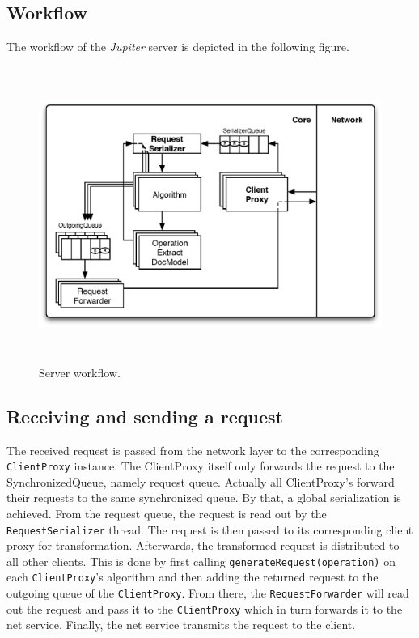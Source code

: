 \subsection{Workflow}
The workflow of the \emph{Jupiter} server is depicted in the following figure.
\begin{figure}[H]
\centering
\includegraphics[height=9.64cm,width=14.3cm]{../../images/algo-impl/workflow_server.eps}
\caption{Server workflow.}
\label{Server workflow.}
\end{figure}

\subsection{Receiving and sending a request}
The received request is passed from the network layer to the corresponding \texttt{ClientProxy} instance. The {ClientProxy} itself only forwards the request to the {SynchronizedQueue}, namely request queue. Actually all {ClientProxy}'s forward their requests to the same synchronized queue. By that, a global serialization is achieved. From the request queue, the request is read out by the \texttt{RequestSerializer} thread. The request is then passed to its corresponding client proxy for transformation. Afterwards, the transformed request is distributed to all other clients. This is done by first calling \texttt{generateRequest(operation)} on each \texttt{ClientProxy}'s algorithm and then adding the returned request to the outgoing queue of the \texttt{ClientProxy}. From there, the \texttt{RequestForwarder} will read out the request and pass it to the \texttt{ClientProxy} which in turn forwards it to the net service. Finally, the net service transmits the request to the client.

